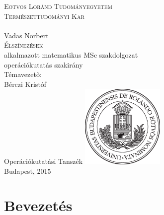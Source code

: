 \documentclass[12pt, a4paper]{report}
\theoremstyle{remark}
\theoremstyle{definition}
\begin{document}

\begin{titlepage}
\begin{center}
{\huge \textsc{Eötvös Loránd Tudományegyetem \\ Természettudományi Kar \\}}
\hrulefill \\[2.5cm]
{\huge Vadas Norbert} \\[0.7cm]
{\Huge \textsc{Élszínezések}} \\[0.7cm]
alkalmazott matematikus MSc szakdolgozat \\[0.1cm]
operációkutatás szakirány \\[2.2cm]
{\large Témavezetõ:} \\[0.4cm]
{\Large Bérczi Kristóf} \\[0.3cm] 
{\Large Operációkutatási Tanszék}
\vfill
\includegraphics[width=0.3\textwidth]{./images/elte_cimer_ff} \\[0.5cm]
{\large Budapest, 2015}
\end{center}
\end{titlepage}

\tableofcontents

\chapter{Bevezetés} 
\end{document}
